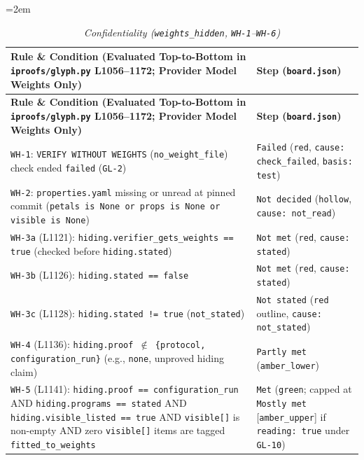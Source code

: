 \documentclass[11pt,letterpaper]{article}
\begin{document}
{\footnotesize\setlength{\tabcolsep}{4pt}\emergencystretch=2em
\begin{longtable}{@{}>{\raggedright\arraybackslash}p{} >{\raggedright\arraybackslash}p{}@{}}
\caption{\textit{Confidentiality (\texttt{weights\_\allowbreak{}hidden}, \texttt{WH-1}--\texttt{WH-6})}} \\
\toprule
\textbf{Rule \& Condition (Evaluated Top-to-Bottom in \texttt{iproofs/\allowbreak{}glyph.\allowbreak{}py} L1056--1172; Provider Model Weights Only)} & \textbf{Step (\texttt{board.\allowbreak{}json})} \\
\midrule
\endfirsthead
\toprule
\textbf{Rule \& Condition (Evaluated Top-to-Bottom in \texttt{iproofs/\allowbreak{}glyph.\allowbreak{}py} L1056--1172; Provider Model Weights Only)} & \textbf{Step (\texttt{board.\allowbreak{}json})} \\
\midrule
\endhead
\bottomrule
\endfoot
\texttt{WH-1}: \texttt{VERIFY WITHOUT WEIGHTS} (\texttt{no\_\allowbreak{}weight\_\allowbreak{}file}) check ended \texttt{failed} (\texttt{GL-2}) & \texttt{Failed} (\texttt{red}, \texttt{cause: check\_\allowbreak{}failed}, \texttt{basis: test}) \\
\texttt{WH-2}: \texttt{properties.\allowbreak{}yaml} missing or unread at pinned commit (\texttt{petals is None or props is None or visible is None}) & \texttt{Not decided} (\texttt{hollow}, \texttt{cause: not\_\allowbreak{}read}) \\
\texttt{WH-3a} (L1121): \texttt{hiding.\allowbreak{}verifier\_\allowbreak{}gets\_\allowbreak{}weights == true} (checked before \texttt{hiding.\allowbreak{}stated}) & \texttt{Not met} (\texttt{red}, \texttt{cause: stated}) \\
\texttt{WH-3b} (L1126): \texttt{hiding.\allowbreak{}stated == false} & \texttt{Not met} (\texttt{red}, \texttt{cause: stated}) \\
\texttt{WH-3c} (L1128): \texttt{hiding.\allowbreak{}stated != true} (\texttt{not\_\allowbreak{}stated}) & \texttt{Not stated} (\texttt{red} outline, \texttt{cause: not\_\allowbreak{}stated}) \\
\texttt{WH-4} (L1136): \texttt{hiding.\allowbreak{}proof $\notin$ \{protocol, configuration\_\allowbreak{}run\}} (e.g., \texttt{none}, unproved hiding claim) & \texttt{Partly met} (\texttt{amber\_\allowbreak{}lower}) \\
\texttt{WH-5} (L1141): \texttt{hiding.\allowbreak{}proof == configuration\_\allowbreak{}run} AND \texttt{hiding.\allowbreak{}programs == stated} AND \texttt{hiding.\allowbreak{}visible\_\allowbreak{}listed == true} AND \texttt{visible[]} is non-empty AND zero \texttt{visible[]} items are tagged \texttt{fitted\_\allowbreak{}to\_\allowbreak{}weights} & \texttt{Met} (\texttt{green}; capped at \texttt{Mostly met} [\texttt{amber\_\allowbreak{}upper}] if \texttt{reading: true} under \texttt{GL-10}) \\

\end{longtable}}
\end{document}
